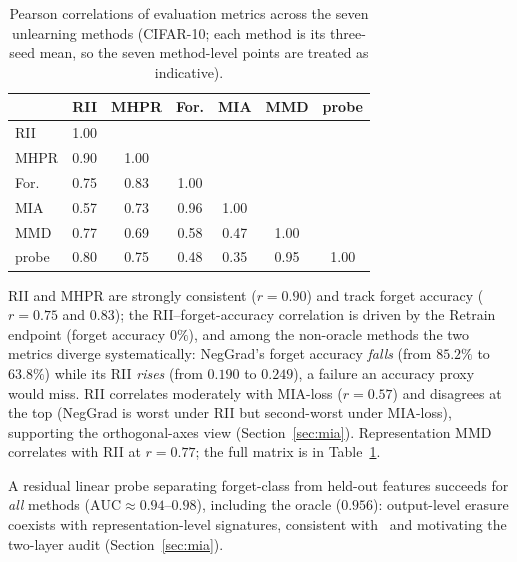\documentclass[smallextended]{svjour3}       %
\begin{document}
\begin{table}[t]
\centering
\small
\caption{Pearson correlations of evaluation metrics across the seven unlearning methods (CIFAR-10; each method is its three-seed mean, so the seven method-level points are treated as indicative).}
\label{tab:corr}
\setlength{\tabcolsep}{4pt}
\begin{tabular}{l c c c c c c}
\toprule
 & RII & MHPR & For. & MIA & MMD & probe \\
\midrule
RII & 1.00 & & & & & \\
MHPR & 0.90 & 1.00 & & & & \\
For. & 0.75 & 0.83 & 1.00 & & & \\
MIA & 0.57 & 0.73 & 0.96 & 1.00 & & \\
MMD & 0.77 & 0.69 & 0.58 & 0.47 & 1.00 & \\
probe & 0.80 & 0.75 & 0.48 & 0.35 & 0.95 & 1.00 \\
\bottomrule
\end{tabular}
\end{table}

RII and MHPR are strongly consistent ($r{=}0.90$) and track forget accuracy ($r{=}0.75$ and $0.83$); the RII--forget-accuracy correlation is driven by the Retrain endpoint (forget accuracy $0\%$), and among the non-oracle methods the two metrics diverge systematically: NegGrad's forget accuracy \emph{falls} (from $85.2\%$ to $63.8\%$) while its RII \emph{rises} (from $0.190$ to $0.249$), a failure an accuracy proxy would miss. RII correlates moderately with MIA-loss ($r{=}0.57$) and disagrees at the top (NegGrad is worst under RII but second-worst under MIA-loss), supporting the orthogonal-axes view (Section~\ref{sec:mia}). Representation MMD correlates with RII at $r{=}0.77$; the full matrix is in Table~\ref{tab:corr}.

A residual linear probe separating forget-class from held-out features succeeds for \emph{all} methods ($\mathrm{AUC}\approx0.94$--$0.98$), including the oracle ($0.956$): output-level erasure coexists with representation-level signatures, consistent with~\cite{cosma2026ruler,yong2026erased} and motivating the two-layer audit (Section~\ref{sec:mia}).
\end{document}
